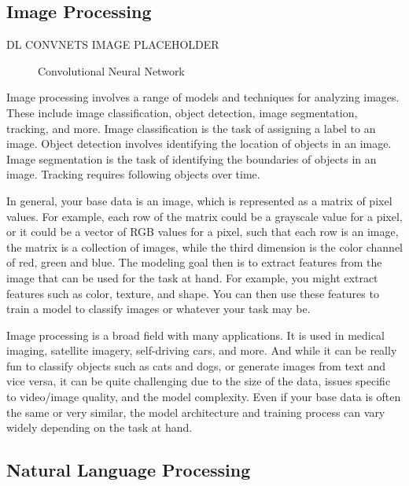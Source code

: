 \documentclass[
  letterpaper,
]{krantz}
\begin{document}
\subsection{Image Processing}\label{image-processing}

DL CONVNETS IMAGE PLACEHOLDER

\begin{figure}[H]


\caption{\label{fig-cnn}Convolutional Neural Network}

\end{figure}%

Image processing involves a range of models and techniques for analyzing
images. These include image classification, object detection, image
segmentation, tracking, and more. Image classification is the task of
assigning a label to an image. Object detection involves identifying the
location of objects in an image. Image segmentation is the task of
identifying the boundaries of objects in an image. Tracking requires
following objects over time.

In general, your base data is an image, which is represented as a matrix
of pixel values. For example, each row of the matrix could be a
grayscale value for a pixel, or it could be a vector of RGB values for a
pixel, such that each row is an image, the matrix is a collection of
images, while the third dimension is the color channel of red, green and
blue. The modeling goal then is to extract features from the image that
can be used for the task at hand. For example, you might extract
features such as color, texture, and shape. You can then use these
features to train a model to classify images or whatever your task may
be.

Image processing is a broad field with many applications. It is used in
medical imaging, satellite imagery, self-driving cars, and more. And
while it can be really fun to classify objects such as cats and dogs, or
generate images from text and vice versa, it can be quite challenging
due to the size of the data, issues specific to video/image quality, and
the model complexity. Even if your base data is often the same or very
similar, the model architecture and training process can vary widely
depending on the task at hand.

\subsection{Natural Language
Processing}\label{natural-language-processing}
\end{document}
